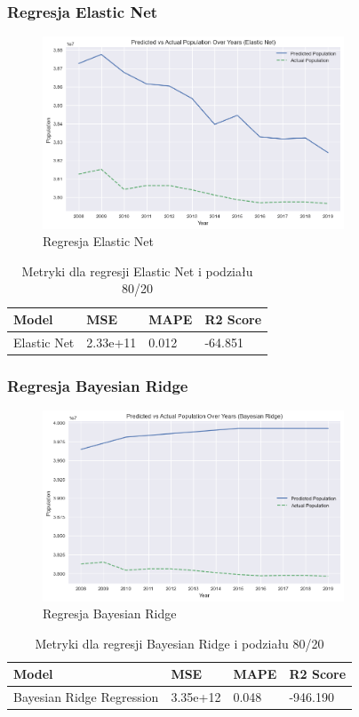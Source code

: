 \documentclass[11pt]{article}
\begin{document}
\subsubsection{Regresja Elastic Net}
\begin{figure}[H]
        \centering
        \includegraphics[width=0.8\textwidth]{images/elastic_net.png}
        \caption{Regresja Elastic Net}
\end{figure}
\begin{table}[H]
        \centering
        \begin{tabular}{|l|l|l|l|}
        \hline
        Model & MSE & MAPE & R2 Score \\ \hline
        Elastic Net & 2.33e+11 & 0.012 & -64.851 \\ \hline
        \end{tabular}
        \caption{Metryki dla regresji Elastic Net i podziału 80/20}
\end{table}
\subsubsection{Regresja Bayesian Ridge}
\begin{figure}[H]
        \centering
        \includegraphics[width=0.8\textwidth]{images/bayesian_ridge.png}
        \caption{Regresja Bayesian Ridge}
\end{figure}
\begin{table}[H]
        \centering
        \begin{tabular}{|l|l|l|l|}
        \hline
        Model & MSE & MAPE & R2 Score \\ \hline
        Bayesian Ridge Regression & 3.35e+12 & 0.048 & -946.190 \\ \hline
        \end{tabular}
        \caption{Metryki dla regresji Bayesian Ridge i podziału 80/20}
        \end{table}
\end{document}
